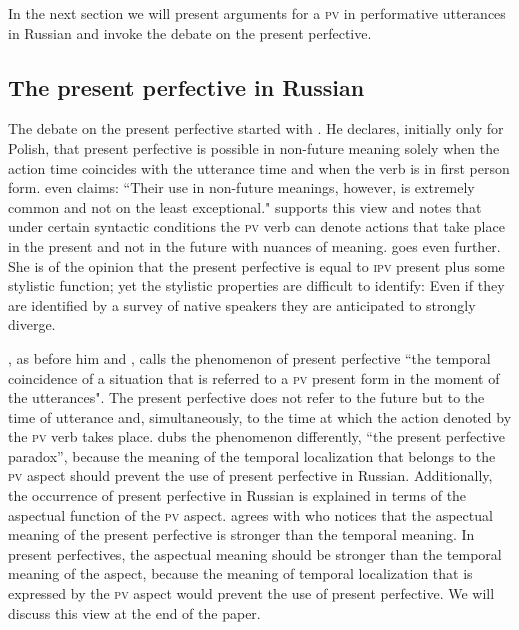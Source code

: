 \documentclass[output=paper,
colorlinks,
citecolor=brown,
newtxmath,
hidelinks
]{langscibook}
\begin{document}
In the next section we will present arguments for a \textsc{pv} in performative utterances in Russian and invoke the debate on the present perfective.

\subsection{The present perfective in Russian}\label{sub:eins:4}

The debate on the present perfective started with \citet{Koschmieder1929}. He declares, initially only for Polish, that present perfective is possible in non-future meaning solely when the action time coincides with the utterance time and when the verb is in first person form. \citet[120]{Forsyth1970} even claims: “Their use in non-future meanings, however, is extremely common and not on the least exceptional." \citet{Svedova1980} supports this view and notes that under certain syntactic conditions the \textsc{pv} verb can denote actions that take place in the present and not in the future with nuances of meaning. \citet{Rathmayr1976} goes even further. She is of the opinion that the present perfective is equal to \textsc{ipv} present plus some stylistic function; yet the stylistic properties are difficult to identify: Even if they are identified by a survey of native speakers they are anticipated to strongly diverge. 

\citet{Dickey2000}, as before him \citet{Bondarko1971} and \citet{Galton1976}, calls the phenomenon of present perfective “the temporal coincidence of a situation that is referred to a \textsc{pv} present form in the moment of the utterances". The present perfective does not refer to the future but to the time of utterance and, simultaneously, to the time at which the action denoted by the \textsc{pv} verb takes place. \citet{Dewit2017} dubs the phenomenon differently, “the present perfective paradox”, because the meaning of the temporal localization that belongs to the \textsc{pv} aspect should prevent the use of present perfective in Russian. Additionally, the occurrence of present perfective in Russian is explained in terms of the aspectual function of the \textsc{pv} aspect. \citet{Dewit2017} agrees with \citet{Breu2000ProblemederInteraktion} who notices that the aspectual meaning of the present perfective is stronger than the temporal meaning. In present perfectives, the aspectual meaning should be stronger than the temporal meaning of the aspect, because the meaning of temporal localization that is expressed by the \textsc{pv} aspect would prevent the use of present perfective. We will discuss this view at the end of the paper. 
\end{document}
